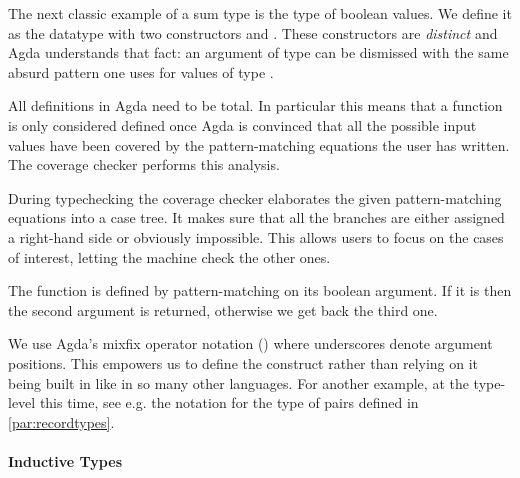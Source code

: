 The next classic example of a sum type is the type of boolean values. We define
it as the datatype with two constructors  and . These
constructors are \emph{distinct} and Agda understands that fact: an argument
of type {  } can be dismissed with the same absurd
pattern one uses for values of type .

\begin{minipage}[t]{0.5\textwidth}
\end{minipage}\begin{minipage}[t]{0.5\textwidth}
\end{minipage}

All definitions in Agda need to be total. In particular this means that a
function is only considered defined once Agda is convinced that all the
possible input values have been covered by the pattern-matching equations
the user has written. The coverage checker performs this analysis.

\begin{feature} During typechecking the coverage checker
elaborates the given pattern-matching equations into a case tree. It makes
sure that all the branches are either assigned a right-hand side or obviously
impossible. This allows users to focus on the cases of interest, letting the
machine check the other ones.
\end{feature}

The function  is defined by pattern-matching on its
boolean argument. If it is  then the second argument is returned,
otherwise we get back the third one.


\begin{feature} We use Agda's mixfix operator notation
(\cite{danielsson2011parsing}) where underscores denote argument positions.
This empowers us to define the  construct rather than
relying on it being built in like in so many other languages. For another
example, at the type-level this time, see e.g. the notation  for
the type of pairs defined in \cref{par:recordtypes}.
\end{feature}

\paragraph{Inductive Types}

